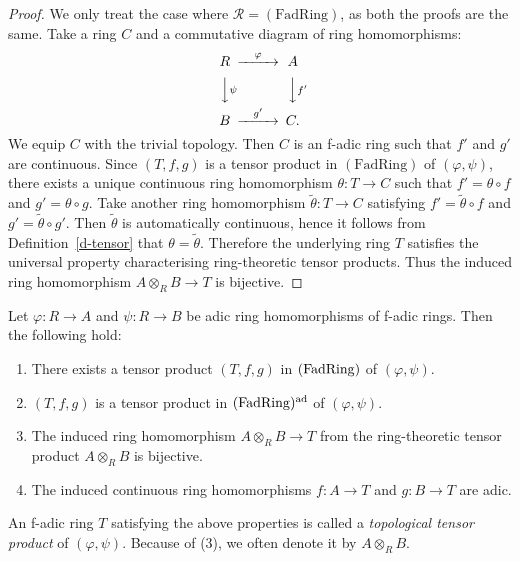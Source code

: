 \begin{proof}
We only treat the case where $\mathcal R=(\text{FadRing})$, 
as both the proofs are the same. 
Take a ring $C$ and a commutative diagram of ring homomorphisms: 
$$\begin{CD}
R @>\varphi >> A\\
@VV\psi V @VVf'V\\
B @>g'>> C.
\end{CD}$$
We equip $C$ with the trivial topology. 
Then $C$ is an f-adic ring such that $f'$ and $g'$ are continuous. 
Since $(T, f, g)$ is a tensor product in $(\text{FadRing})$ of $(\varphi, \psi)$, 
there exists a unique continuous ring homomorphism 
$\theta:T \to C$ such that $f'=\theta \circ f$ and $g'=\theta \circ g$. 
Take another ring homomorphism $\widetilde{\theta}:T \to C$ 
satisfying $f'=\widetilde \theta \circ f$ and $g'=\widetilde \theta \circ g'$. 
Then $\widetilde \theta$ is automatically continuous, 
hence it follows from Definition~\ref{d-tensor} that 
$\theta=\widetilde \theta$. 
Therefore the underlying ring $T$ satisfies the universal property 
characterising ring-theoretic tensor products. 
Thus the induced ring homomorphism $A \otimes_R B \to T$ 
is bijective. 
\end{proof}





\begin{thm}\label{t-top-tensor}
Let $\varphi:R \to A$ and $\psi:R \to B$ 
be adic ring homomorphisms of f-adic rings. 
Then the following hold:  
\begin{enumerate}
\item 
There exists a tensor product $(T, f, g)$ in $({\rm FadRing})$ 
of $(\varphi, \psi)$. 
\item 
$(T, f, g)$ is a tensor product in $({\rm FadRing})^{{\rm ad}}$ 
of $(\varphi, \psi)$. 
\item 
The induced ring homomorphism $A \otimes_R B \to T$ 
from the ring-theoretic tensor product $A \otimes_R B$ is bijective. 
\item 
The induced continuous ring homomorphisms $f:A \to T$ and $g:B \to T$ are adic. 
\end{enumerate}
\end{thm}

An f-adic ring $T$ satisfying the above properties 
is called a {\em topological tensor product} of $(\varphi, \psi)$. 
Because of (3), we often denote it by $A \otimes_R B$. 


